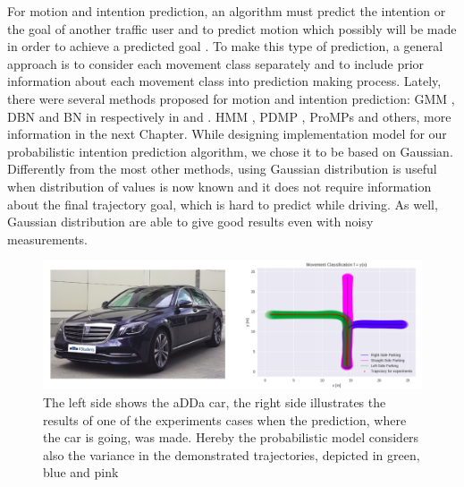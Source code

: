 For motion and intention prediction, an algorithm must predict the intention or the goal of another traffic user and to predict motion which possibly will be made in order to achieve a predicted goal \cite{IntroII, IntroIII}. To make this type of prediction, a general approach is to consider each movement class separately and to include prior information about each movement class into prediction making process. Lately, there were several methods proposed for motion and intention prediction: \gls{GMM} \cite{GausianMM},  \gls{DBN} and \gls{BN} in respectively in \cite{BN1} and \cite{BN2}. \gls{HMM} \cite{Markov3, Markov4}, \gls{PDMP} \cite{DMP},  \gls{ProMPs} \cite{ProMPs} and others, more information in the next Chapter. While designing implementation model for our probabilistic intention prediction algorithm, we chose it to be based on Gaussian. Differently from the most other methods, using Gaussian distribution is useful when distribution of values is now known and it does not require information about the final trajectory goal, which is hard to predict while driving.  As well, Gaussian distribution are able to give good results even with noisy measurements. \\

\begin{figure}[H]
	\centering  	
	\includegraphics[width=14cm]{img/intro.png}
	\caption{The left side shows the \gls{aDDa} car, the right side illustrates the results of one of the experiments cases when the prediction, where the car is going, was made. Hereby the probabilistic model considers also the variance in the demonstrated trajectories, depicted in green, blue and pink}
	\label{fig:intro}    
\end{figure}

